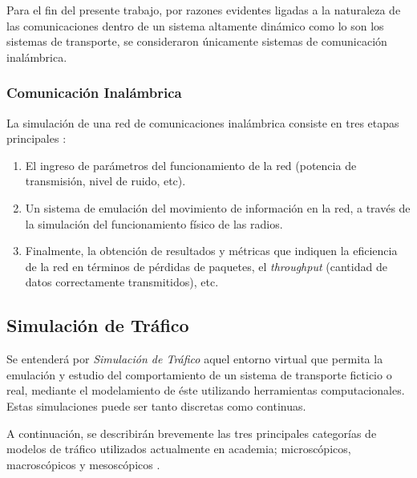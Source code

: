 Para el fin del presente trabajo, por razones evidentes ligadas a la naturaleza de las comunicaciones dentro de un sistema altamente dinámico como lo son los sistemas de transporte, se consideraron únicamente sistemas de comunicación inalámbrica.

\subsubsection{Comunicación Inalámbrica}


La simulación de una red de comunicaciones inalámbrica consiste en tres etapas principales \autocite{shalaby}:
\begin{enumerate}
    \item El ingreso de parámetros del funcionamiento de la red (potencia de transmisión, nivel de ruido, etc).
    \item Un sistema de emulación del movimiento de información en la red, a través de la simulación del funcionamiento físico de las radios.
    \item Finalmente, la obtención de resultados y métricas que indiquen la eficiencia de la red en términos de pérdidas de paquetes, el \emph{throughput} (cantidad de datos correctamente transmitidos), etc.
\end{enumerate}

\subsection{Simulación de Tráfico}

Se entenderá por \emph{Simulación de Tráfico} aquel entorno virtual que permita la emulación y estudio del comportamiento de un sistema de transporte ficticio o real, mediante el modelamiento de éste utilizando herramientas computacionales. Estas simulaciones puede ser tanto discretas como continuas.

A continuación, se describirán brevemente las tres principales categorías de modelos de tráfico utilizados actualmente en academia; microscópicos, macroscópicos y mesoscópicos \autocite{ratrout2009comparative,boxill2000evaluation,shalaby}.

